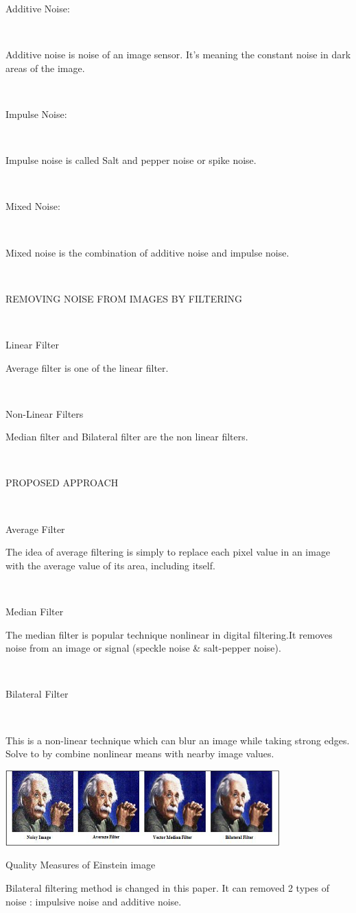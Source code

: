 Additive Noise:

\

Additive noise is noise of an image sensor. It's meaning the constant noise in dark areas of the image.

\

Impulse Noise:

\

Impulse noise is called Salt and pepper noise or spike noise. 

\

Mixed Noise:

\

Mixed noise is the combination of additive noise and impulse noise.

\

REMOVING NOISE FROM IMAGES BY FILTERING

\

Linear Filter

Average filter is one of the linear filter.

\

Non-Linear Filters

Median filter and Bilateral filter are the non linear filters.

\

PROPOSED APPROACH

\

Average Filter

The idea of average filtering is simply to replace each pixel value in an image with the average value of its area, including itself.

\  

Median Filter

The median filter is popular technique nonlinear in digital filtering.It removes noise from an image or signal (speckle noise \& salt-pepper noise).


\ 

Bilateral Filter

\

This is a non-linear technique which can blur an image while taking strong edges. Solve to by combine nonlinear means  with nearby image values. 

\vspace{0.1cm}

\begin{center}
\includegraphics{10.png}

 Quality Measures of Einstein image
\end{center}

 Bilateral filtering method is changed in this paper. It can removed 2 types of noise : impulsive noise and additive noise.
